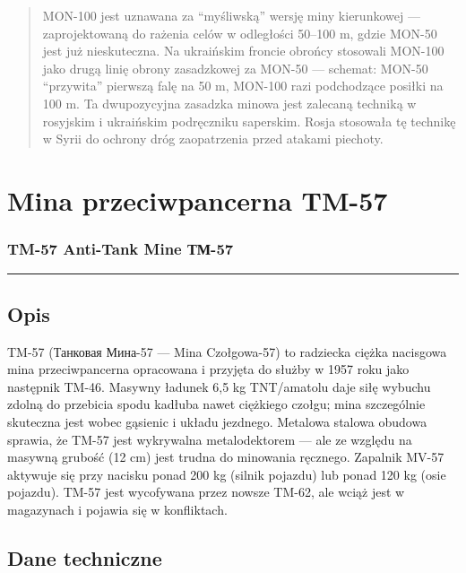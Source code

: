 \documentclass[12pt,openany,oneside]{book}
\begin{document}
\begin{quote}
MON-100 jest uznawana za ``myśliwską'' wersję miny kierunkowej ---
zaprojektowaną do rażenia celów w odległości 50--100 m, gdzie MON-50
jest już nieskuteczna. Na ukraińskim froncie obrońcy stosowali MON-100
jako drugą linię obrony zasadzkowej za MON-50 --- schemat: MON-50
``przywita'' pierwszą falę na 50 m, MON-100 razi podchodzące posiłki na
100 m. Ta dwupozycyjna zasadzka minowa jest zalecaną techniką w
rosyjskim i ukraińskim podręczniku saperskim. Rosja stosowała tę
technikę w Syrii do ochrony dróg zaopatrzenia przed atakami piechoty.
\end{quote}

\chapter{Mina przeciwpancerna TM-57}\label{mina-przeciwpancerna-tm-57}

\subsection{TM-57 Anti-Tank Mine \textbar{}
ТМ-57}\label{tm-57-anti-tank-mine-ux442ux43c-57}

\begin{center}\rule{0.5\linewidth}{0.5pt}\end{center}

\section{Opis}\label{opis-114}

TM-57 (Танковая Мина-57 --- Mina Czołgowa-57) to radziecka ciężka
nacisgowa mina przeciwpancerna opracowana i przyjęta do służby w 1957
roku jako następnik TM-46. Masywny ładunek 6,5 kg TNT/amatolu daje siłę
wybuchu zdolną do przebicia spodu kadłuba nawet ciężkiego czołgu; mina
szczególnie skuteczna jest wobec gąsienic i układu jezdnego. Metalowa
stalowa obudowa sprawia, że TM-57 jest wykrywalna metalodektorem --- ale
ze względu na masywną grubość (12 cm) jest trudna do minowania ręcznego.
Zapalnik MV-57 aktywuje się przy nacisku ponad 200 kg (silnik pojazdu)
lub ponad 120 kg (osie pojazdu). TM-57 jest wycofywana przez nowsze
TM-62, ale wciąż jest w magazynach i pojawia się w konfliktach.

\section{Dane techniczne}\label{dane-techniczne-114}
\end{document}
